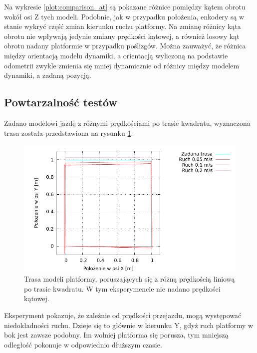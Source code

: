 			Na wykresie \ref{plot:comparison_at} są pokazane różnice pomiędzy kątem obrotu wokół osi Z tych modeli.
			Podobnie, jak w przypadku położenia, enkodery są w stanie wykryć część zmian kierunku ruchu platformy.
			Na zmianę różnicy kąta obrotu nie wpływają jedynie zmiany prędkości kątowej, a również losowy kąt obrotu nadany platformie w przypadku poślizgów.
			Można zauważyć, że różnica między orientacją modelu dynamiki, a orientacją wyliczoną na podstawie odometrii zwykle zmienia się mniej dynamicznie od 
			różnicy między modelem dynamiki, a zadaną pozycją.
			
	\subsection{Powtarzalność testów}
		Zadano modelowi jazdę z różnymi prędkościami po trasie kwadratu, wyznaczona trasa została przedstawiona na rysunku \ref{plot:repetitions_xy}.
		
		\begin{figure}[h]
			\centering
			\includegraphics[width=\textwidth]{plots/repetitions_xy.pdf}
				\caption{Trasa modeli platformy, poruszających się z różną prędkością liniową po trasie kwadratu. W tym eksperymencie nie nadano prędkości kątowej.}
			\label{plot:repetitions_xy}
		\end{figure}
		
		Eksperyment pokazuje, że zależnie od prędkości przejazdu, mogą występować niedokładności ruchu. Dzieje się to głównie w kierunku Y, gdyż ruch
		platformy w bok jest zawsze podobny. Im wolniej platforma się porusza, tym mniejszą odległość pokonuje w odpowiednio dłuższym czasie. 
		 

